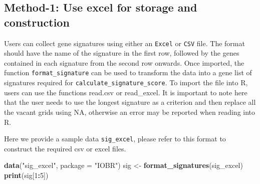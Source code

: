 \documentclass[
  12pt,
]{book}
\newenvironment{Shaded}{\begin{snugshade}}{\end{snugshade}}
\newcommand{\AttributeTok}[1]{\textcolor[rgb]{0.13,0.29,0.53}{#1}}
\newcommand{\DecValTok}[1]{\textcolor[rgb]{0.00,0.00,0.81}{#1}}
\newcommand{\FunctionTok}[1]{\textcolor[rgb]{0.13,0.29,0.53}{\textbf{#1}}}
\newcommand{\NormalTok}[1]{#1}
\newcommand{\OtherTok}[1]{\textcolor[rgb]{0.56,0.35,0.01}{#1}}
\newcommand{\SpecialCharTok}[1]{\textcolor[rgb]{0.81,0.36,0.00}{\textbf{#1}}}
\newcommand{\StringTok}[1]{\textcolor[rgb]{0.31,0.60,0.02}{#1}}
\begin{document}
\hypertarget{method-1-use-excel-for-storage-and-construction}{%
\subsection{Method-1: Use excel for storage and construction}\label{method-1-use-excel-for-storage-and-construction}}

Users can collect gene signatures using either an \texttt{Excel} or \texttt{CSV} file. The format should have the name of the signature in the first row, followed by the genes contained in each signature from the second row onwards. Once imported, the function \texttt{format\_signature} can be used to transform the data into a gene list of signatures required for \texttt{calculate\_signature\_score}. To import the file into R, users can use the functions read.csv or read\_excel. It is important to note here that the user needs to use the longest signature as a criterion and then replace all the vacant grids using NA, otherwise an error may be reported when reading into R.

Here we provide a sample data \texttt{sig\_excel}, please refer to this format to construct the required csv or excel files.

\begin{Shaded}
\begin{Highlighting}[]
\FunctionTok{data}\NormalTok{(}\StringTok{"sig\_excel"}\NormalTok{, }\AttributeTok{package =} \StringTok{"IOBR"}\NormalTok{)}
\NormalTok{sig }\OtherTok{\textless{}{-}} \FunctionTok{format\_signatures}\NormalTok{(sig\_excel)}
\FunctionTok{print}\NormalTok{(sig[}\DecValTok{1}\SpecialCharTok{:}\DecValTok{5}\NormalTok{])}
\end{Highlighting}
\end{Shaded}
\end{document}
